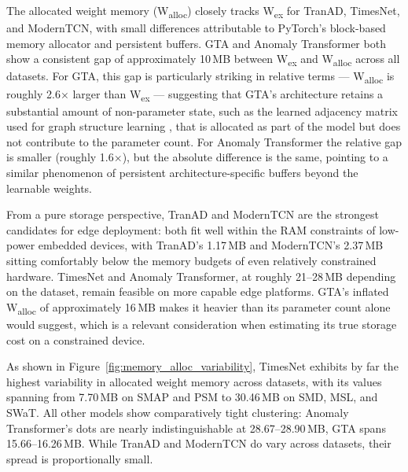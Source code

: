 \documentclass[twoside,11pt,openright]{report}
\begin{document}
The allocated weight memory (W\textsubscript{alloc}) closely tracks W\textsubscript{ex} 
for TranAD, TimesNet, and ModernTCN, with small differences attributable to PyTorch's 
block-based memory allocator and persistent buffers. GTA and Anomaly Transformer both 
show a consistent gap of approximately 10\,MB between W\textsubscript{ex} and 
W\textsubscript{alloc} across all datasets. For GTA, this gap is particularly striking 
in relative terms --- W\textsubscript{alloc} is roughly 2.6$\times$ larger than 
W\textsubscript{ex} --- suggesting that GTA's architecture retains a substantial amount 
of non-parameter state, such as the learned adjacency matrix used for graph structure 
learning \citep{gta2022}, that is allocated as part of the model but does not contribute 
to the parameter count. For Anomaly Transformer the relative gap is smaller (roughly 
1.6$\times$), but the absolute difference is the same, pointing to a similar phenomenon 
of persistent architecture-specific buffers beyond the learnable weights.

From a pure storage perspective, TranAD and ModernTCN are the strongest candidates for 
edge deployment: both fit well within the RAM constraints of low-power embedded devices, 
with TranAD's 1.17\,MB and ModernTCN's 2.37\,MB sitting comfortably below the memory 
budgets of even relatively constrained hardware. TimesNet and Anomaly Transformer, at 
roughly 21--28\,MB depending on the dataset, remain feasible on more capable edge 
platforms. GTA's inflated W\textsubscript{alloc} of approximately 
16\,MB makes it heavier than its parameter count alone would suggest, which is a relevant 
consideration when estimating its true storage cost on a constrained device.

As shown in Figure~\ref{fig:memory_alloc_variability}, TimesNet \citep{timesnet2023} 
exhibits by far the highest variability in allocated weight memory across datasets, 
with its values spanning from 7.70\,MB on SMAP and PSM to 30.46\,MB on SMD, MSL, and SWaT. 
All other models show comparatively tight clustering: 
Anomaly Transformer's dots are nearly indistinguishable at 28.67--28.90\,MB, GTA 
spans 15.66--16.26\,MB. While TranAD and ModernTCN do vary across datasets, their spread 
is proportionally small.
\end{document}
